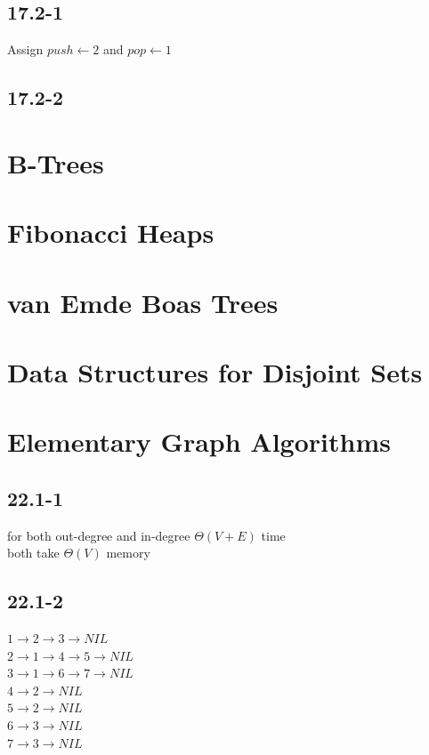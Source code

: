 \documentclass[]{article}
\begin{document}
\subsection{17.2-1}
Assign $push \leftarrow 2$ and $pop \leftarrow 1$

\subsection{17.2-2}


\section{B-Trees}
\section{Fibonacci Heaps}
\section{van Emde Boas Trees}
\section{Data Structures for Disjoint Sets}

\section{Elementary Graph Algorithms}

\subsection{22.1-1}
for both out-degree and in-degree $\Theta (V+E)$ time\\
both take $\Theta (V)$ memory

\subsection{22.1-2}

$1 \rightarrow 2 \rightarrow 3 \rightarrow NIL$\\
$2 \rightarrow 1 \rightarrow 4 \rightarrow 5 \rightarrow NIL$\\
$3 \rightarrow 1 \rightarrow 6 \rightarrow 7 \rightarrow NIL$\\
$4 \rightarrow 2 \rightarrow NIL$\\
$5 \rightarrow 2 \rightarrow NIL$\\
$6 \rightarrow 3 \rightarrow NIL$\\
$7 \rightarrow 3 \rightarrow NIL$
\end{document}
